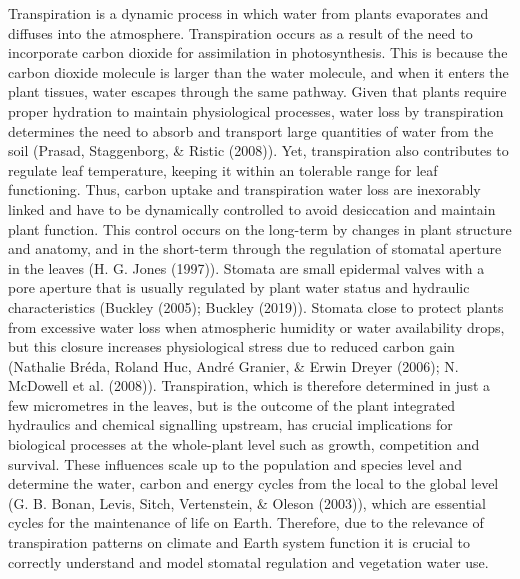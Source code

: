 \documentclass[11pt,twoside]{reedthesis}
\begin{document}
Transpiration is a dynamic process in which water from plants evaporates
and diffuses into the atmosphere. Transpiration occurs as a result of
the need to incorporate carbon dioxide for assimilation in
photosynthesis. This is because the carbon dioxide molecule is larger
than the water molecule, and when it enters the plant tissues, water
escapes through the same pathway. Given that plants require proper
hydration to maintain physiological processes, water loss by
transpiration determines the need to absorb and transport large
quantities of water from the soil (Prasad, Staggenborg, \& Ristic
(2008)). Yet, transpiration also contributes to regulate leaf
temperature, keeping it within an tolerable range for leaf functioning.
Thus, carbon uptake and transpiration water loss are inexorably linked
and have to be dynamically controlled to avoid desiccation and maintain
plant function. This control occurs on the long-term by changes in plant
structure and anatomy, and in the short-term through the regulation of
stomatal aperture in the leaves (H. G. Jones (1997)). Stomata are small
epidermal valves with a pore aperture that is usually regulated by plant
water status and hydraulic characteristics (Buckley (2005); Buckley
(2019)). Stomata close to protect plants from excessive water loss when
atmospheric humidity or water availability drops, but this closure
increases physiological stress due to reduced carbon gain (Nathalie
Bréda, Roland Huc, André Granier, \& Erwin Dreyer (2006); N. McDowell et
al. (2008)). Transpiration, which is therefore determined in just a few
micrometres in the leaves, but is the outcome of the plant integrated
hydraulics and chemical signalling upstream, has crucial implications
for biological processes at the whole-plant level such as growth,
competition and survival. These influences scale up to the population
and species level and determine the water, carbon and energy cycles from
the local to the global level (G. B. Bonan, Levis, Sitch, Vertenstein,
\& Oleson (2003)), which are essential cycles for the maintenance of
life on Earth. Therefore, due to the relevance of transpiration patterns
on climate and Earth system function it is crucial to correctly
understand and model stomatal regulation and vegetation water use.\par
\end{document}
